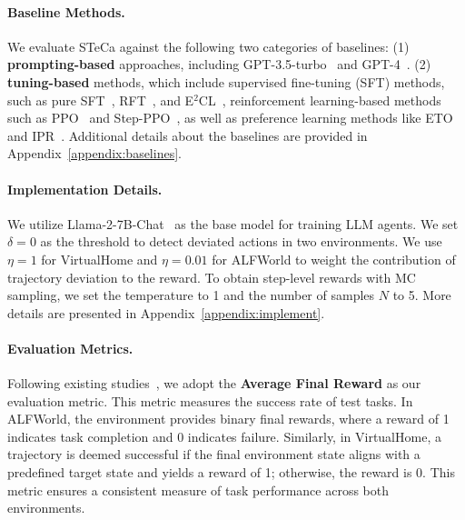 \paragraph{Baseline Methods.}

We evaluate STeCa against the following two categories of baselines: (1) \textbf{prompting-based} approaches, including GPT-3.5-turbo~\citep{ouyang2022training} and GPT-4~\citep{achiam2023gpt}. 
(2) \textbf{tuning-based} methods, which include supervised fine-tuning (SFT) methods, such as pure SFT~\citep{chen2023fireact}, RFT~\citep{yuan2023scaling}, and E$^2$CL~\citep{wang-etal-2024-e2cl}, reinforcement learning-based methods such as PPO~\citep{schulman2017proximal} and Step-PPO~\citep{wang-etal-2024-math}, as well as preference learning methods like ETO~\citep{song2024trial} and IPR~\citep{xiong2024watch}. Additional details about the baselines are provided in Appendix~\ref{appendix:baselines}.





\paragraph{Implementation Details.}

We utilize Llama-2-7B-Chat~\citep{touvron2023llama} as the base model for training LLM agents. We set $\delta=0$ as the threshold to detect deviated actions in two environments. We use $\eta=1$ for VirtualHome and $\eta=0.01$ for ALFWorld to weight the contribution of trajectory deviation to the reward. To obtain step-level rewards with MC sampling, we set the temperature to 1 and the number of samples $N$ to 5. More details are presented in Appendix~\ref{appendix:implement}.



\paragraph{Evaluation Metrics.}
Following existing studies~\cite{song2024trial,xiong2024watch}, we adopt the \textbf{Average Final Reward} as our evaluation metric. This metric measures the success rate of test tasks. 
In ALFWorld, the environment provides binary final rewards, where a reward of 1 indicates task completion and 0 indicates failure. 
Similarly, in VirtualHome, a trajectory is deemed successful if the final environment state aligns with a predefined target state and yields a reward of 1; otherwise, the reward is 0. 
This metric ensures a consistent measure of task performance across both environments.



